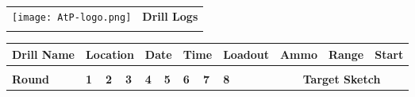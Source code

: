 \documentclass[../Cover.tex]{subfiles}
\begin{document}
\begin{minipage}[t][0.15\textheight][t]{\textwidth}
	\begin{tabular}{p{} p{}}
	\texttt{[image: AtP-logo.png]} & \textbf{Drill Logs} \\
	&\\[.5cm]
	\end{tabular}
\end{minipage}
\begin{minipage}[t][0.85\textheight][t]{\textwidth}
	\begin{tabular}{|l|l|l|l|l|l|l|l|l|l|l|l|l|l|l|l|l|l|l|l|}
		\hline
		\multicolumn{3}{|l|}{\cellcolor[HTML]{C0C0C0}\textbf{Drill Name}} & \multicolumn{3}{l|}{\cellcolor[HTML]{C0C0C0}\textbf{Location}}                                               & \multicolumn{2}{l|}{\cellcolor[HTML]{C0C0C0}\textbf{Date}}              & \multicolumn{2}{l|}{\cellcolor[HTML]{C0C0C0}\textbf{Time}}              & \multicolumn{3}{l|}{\cellcolor[HTML]{C0C0C0}\textbf{Loadout}} & \multicolumn{3}{l|}{\cellcolor[HTML]{C0C0C0}\textbf{Ammo}} & \multicolumn{2}{l|}{\cellcolor[HTML]{C0C0C0}\textbf{Range}} & \multicolumn{2}{l|}{\cellcolor[HTML]{C0C0C0}\textbf{Start}} \\ \hline
		\multicolumn{3}{|l|}{}                                            & \multicolumn{3}{l|}{}                                                                                        & \multicolumn{2}{l|}{}                                                   & \multicolumn{2}{l|}{}                                                   & \multicolumn{3}{l|}{}                                         & \multicolumn{3}{l|}{}                                      & \multicolumn{2}{l|}{}                                       & \multicolumn{2}{l|}{}                                       \\ \hline
		\multicolumn{3}{|l|}{\cellcolor[HTML]{C0C0C0}\textbf{Round}}      & \cellcolor[HTML]{C0C0C0}\textbf{1} & \cellcolor[HTML]{C0C0C0}\textbf{2} & \cellcolor[HTML]{C0C0C0}\textbf{3} & \cellcolor[HTML]{C0C0C0}\textbf{4} & \cellcolor[HTML]{C0C0C0}\textbf{5} & \cellcolor[HTML]{C0C0C0}\textbf{6} & \cellcolor[HTML]{C0C0C0}\textbf{7} & \cellcolor[HTML]{C0C0C0}\textbf{8}        &         & \multicolumn{8}{c|}{\cellcolor[HTML]{C0C0C0}\textbf{Target Sketch}}                                                                                                                              \\ \cline{1-11} \cline{13-20} 

\end{tabular}
\end{minipage}
\end{document}
